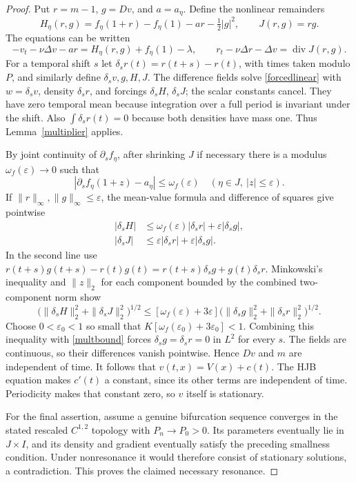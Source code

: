 \documentclass[11pt]{article}
\DeclareMathOperator{\diver}{div}
\begin{document}
\begin{proof}
Put $r=m-1$, $g=Dv$, and $a=a_\eta$. Define the nonlinear remainders
\[
 H_\eta(r,g)=f_\eta(1+r)-f_\eta(1)-a r-\tfrac12|g|^2,
 \qquad J(r,g)=r g.
\]
The equations can be written
\[
 -v_t-\nu\Delta v-a r=H_\eta(r,g)+f_\eta(1)-\lambda,
 \qquad r_t-\nu\Delta r-\Delta v=\diver J(r,g).
\]
For a temporal shift $s$ let $\delta_s r(t)=r(t+s)-r(t)$, with
times taken modulo $P$, and similarly define $\delta_s v,g,H,J$.
The difference fields solve \eqref{forcedlinear} with
$w=\delta_s v$, density $\delta_s r$, and forcings $\delta_s H$,
$\delta_s J$; the scalar constants cancel. They have zero temporal
mean because integration over a full period is invariant under the shift.
Also $\int\delta_s r(t)=0$ because both densities have mass one.
Thus Lemma~\ref{multiplier} applies.

By joint continuity of $\partial_s f_\eta$, after shrinking $J$ if
necessary there is a modulus $\omega_f(\varepsilon)\to0$ such that
\[
 |\partial_s f_\eta(1+z)-a_\eta|
       \leq\omega_f(\varepsilon)\quad
       (\eta\in J,\ |z|\leq\varepsilon).
\]
If $\|r\|_\infty,\|g\|_\infty\leq\varepsilon$, the mean-value
formula and difference of squares give pointwise
\begin{align*}
 |\delta_s H|&\leq\omega_f(\varepsilon)|\delta_s r|
                               +\varepsilon|\delta_s g|,\\
 |\delta_s J|&\leq\varepsilon|\delta_s r|
                               +\varepsilon|\delta_s g|.
\end{align*}
In the second line use
$r(t+s)g(t+s)-r(t)g(t)
 =r(t+s)\delta_s g+g(t)\delta_s r$.
Minkowski's inequality and $\|z\|_2$ for each component bounded by
the combined two-component norm show
\[
 \bigl(\|\delta_s H\|_2^2+\|\delta_s J\|_2^2\bigr)^{1/2}
 \leq[\omega_f(\varepsilon)+3\varepsilon]
       \bigl(\|\delta_s g\|_2^2+\|\delta_s r\|_2^2\bigr)^{1/2}.
\]
Choose $0<\varepsilon_0<1$ so small that
$K[\omega_f(\varepsilon_0)+3\varepsilon_0]<1$.
Combining this inequality with \eqref{multbound} forces
$\delta_s g=\delta_s r=0$ in $L^2$ for every $s$.
The fields are continuous, so their differences vanish pointwise.
Hence $Dv$ and $m$ are independent of time. It follows that
$v(t,x)=V(x)+c(t)$. The HJB equation makes $c'(t)$ a constant,
since its other terms are independent of time. Periodicity makes that
constant zero, so $v$ itself is stationary.

For the final assertion, assume a genuine bifurcation sequence converges
in the stated rescaled $C^{1,2}$ topology with $P_n\to P_0>0$.
Its parameters eventually lie in $J\times I$, and its density and
gradient eventually satisfy the preceding smallness condition. Under
nonresonance it would therefore consist of stationary solutions, a
contradiction. This proves the claimed necessary resonance.
\end{proof}
\end{document}
